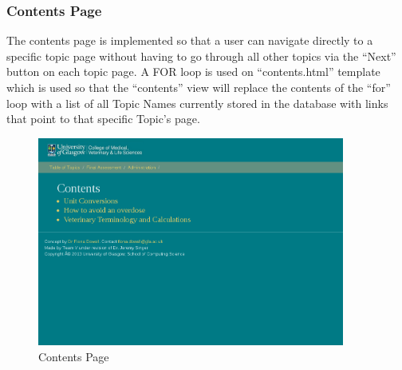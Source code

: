 \documentclass{l3proj}
\begin{document}
{\subsubsection{Contents Page}
The contents page is implemented so that a user can navigate directly to a specific topic page without having to go through all other topics via the “Next” button on each topic page. A FOR loop is used on “contents.html” template which is used so that the “contents” view will replace the contents of the “for” loop with a list of all Topic Names currently stored in the database with links that point to that specific Topic’s page.
\begin{figure}[!htb]
\caption{Contents Page}
 \centering
\includegraphics[width=0.9\textwidth]{images/contentsPage.png}
\end{figure}

}
\end{document}
